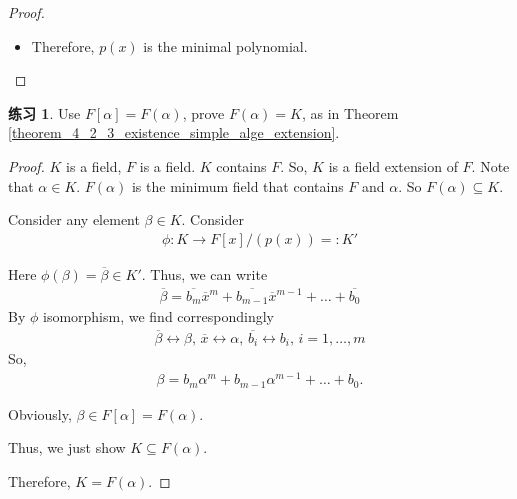 \documentclass[utf8]{ctexbook}
\theoremstyle{definition}
\newtheorem{exercise}{练习}[section]
\begin{document}
\begin{proof}
\begin{itemize}
{\begin{itemize}
{Consider the set
\begin{align*}
U = \{ f(x) \in F[x] | f(\alpha) = 0 \} .
\end{align*}

$U$ is an ideal of $F[x]$:
\begin{align*}
& f(\alpha) =0, \, g(\alpha) = 0 \implies f(\alpha ) - g(\alpha) = 0 \implies f(x) - g(x) \in U \\
& f(\alpha) r(\alpha) = 0 , \forall r(x) \in F[x] \implies f(x) r(x) \in U
\end{align*}

Since $F[x]$ is PID, $U$ is an ideal in $F[x]$ implies $U$ is a principle ideal, so $U = (p_1 (x)) $.

Note that $p(\alpha) = 0$, so $p(x) \in U$. Thus, $p(x) = a p_1 (x)$ since $p(x)$ is irreducible.

By assumption, $p(x) \in F[x]$ and $p_1(x) \in F[x]$ are monic polynomial, they have leading coefficient $= 1$. This implies that $a=1$. So $p(x) = a p_1 (x) = p_1 (x)$. 
}
\item{Therefore, $p(x)$ is the minimal polynomial.}
\end{itemize}
}
\end{itemize}

\end{proof}

\begin{exercise}
Use $F[\alpha] = F(\alpha)$, prove $F(\alpha) = K$, as in Theorem \ref{theorem_4_2_3_existence_simple_alge_extension}.
\end{exercise}

\begin{proof}
$K$ is a field, $F$ is a field. $K$ contains $F$. So, $K$ is a field extension of $F$. Note that $\alpha \in K$. $F(\alpha)$ is the minimum field that contains $F$ and $\alpha$. So $F(\alpha) \subseteq K$. 

Consider any element $\beta \in K$. Consider
\begin{align*}
\phi : K \longrightarrow F[x]/ (p(x)) =: K'
\end{align*}

Here $\phi(\beta) = \overline{\beta} \in K' $. Thus, we can write
\begin{align*}
\overline{\beta} = \overline{b_m} \overline{x}^m + \overline{b_{m-1}} \overline{x}^{m-1} + \ldots + \overline{b_0}
\end{align*}
By $\phi$ isomorphism, we find correspondingly
\begin{align*}
\overline{\beta } \leftrightarrow \beta, \, \overline{x} \leftrightarrow \alpha, \, \overline{b_i} \leftrightarrow b_i, \, i = 1, \ldots , m
\end{align*}
So,
\begin{align*}
\beta = b_m \alpha^m + b_{m-1} \alpha^{m-1} + \ldots + b_0 .
\end{align*} 

Obviously, $\beta \in F[\alpha] = F(\alpha)$.

Thus, we just show $K \subseteq F(\alpha)$.

Therefore, $K = F(\alpha)$.

\end{proof}
\end{document}
